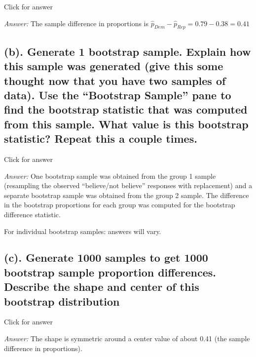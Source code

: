 \documentclass[
]{book}
\begin{document}
Click for answer

\emph{Answer:} The sample difference in proportions is \(\hat{p}_{Dem} - \hat{p}_{Rep} = 0.79 - 0.38 = 0.41\)

\hypertarget{b.-generate-1-bootstrap-sample.-explain-how-this-sample-was-generated-give-this-some-thought-now-that-you-have-two-samples-of-data.-use-the-bootstrap-sample-pane-to-find-the-bootstrap-statistic-that-was-computed-from-this-sample.-what-value-is-this-bootstrap-statistic-repeat-this-a-couple-times.}{%
\subsection{(b). Generate 1 bootstrap sample. Explain how this sample was generated (give this some thought now that you have two samples of data). Use the ``Bootstrap Sample'' pane to find the bootstrap statistic that was computed from this sample. What value is this bootstrap statistic? Repeat this a couple times.}\label{b.-generate-1-bootstrap-sample.-explain-how-this-sample-was-generated-give-this-some-thought-now-that-you-have-two-samples-of-data.-use-the-bootstrap-sample-pane-to-find-the-bootstrap-statistic-that-was-computed-from-this-sample.-what-value-is-this-bootstrap-statistic-repeat-this-a-couple-times.}}

Click for answer

\emph{Answer:} One bootstrap sample was obtained from the group 1 sample (resampling the observed ``believe/not believe'' responses with replacement) and a separate bootstrap sample was obtained from the group 2 sample. The difference in the bootstrap proportions for each group was computed for the bootstrap difference statistic.

For individual bootstrap samples: answers will vary.

\hypertarget{c.-generate-1000-samples-to-get-1000-bootstrap-sample-proportion-differences.-describe-the-shape-and-center-of-this-bootstrap-distribution}{%
\subsection{(c). Generate 1000 samples to get 1000 bootstrap sample proportion differences. Describe the shape and center of this bootstrap distribution}\label{c.-generate-1000-samples-to-get-1000-bootstrap-sample-proportion-differences.-describe-the-shape-and-center-of-this-bootstrap-distribution}}

Click for answer

\emph{Answer:} The shape is symmetric around a center value of about 0.41 (the sample difference in proportions).
\end{document}
